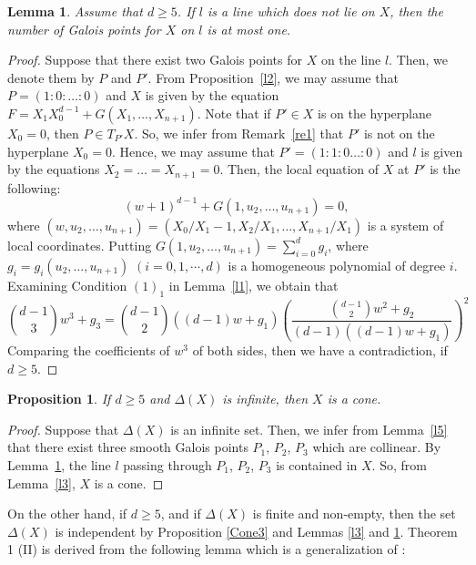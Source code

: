\documentclass[10pt,oneside]{amsart}
\newtheorem{proposition}{Proposition}
\newtheorem{lemma}{Lemma}
\theoremstyle{definition}
\begin{document}
\begin{lemma}\label{l4} Assume that $d \geq 5$. 
If $l$ is a line which does not lie on $X$, then the number of Galois points for $X$ on $l$ is at most one. 
\end{lemma}
\begin{proof} 
Suppose that there exist two Galois points for $X$ on the line $l$. 
Then, we denote them by $P$ and $P'$. 
From Proposition~\ref{l2}, we may assume that $P=(1:0:\dots:0)$ and $X$ is given by the equation $F=X_1X_{0}^{d-1}+G(X_1, \dots, X_{n+1})$. 
Note that if $P' \in X$ is on the hyperplane $X_{0}=0$, then $P \in T_{P'}X$. 
So, we infer from Remark~\ref{re1} that $P'$ is not on the hyperplane $X_{0}=0$. 
Hence, we may assume that $P'=(1:1:0\dots:0)$ and $l$ is given by the equations $X_2=\dots=X_{n+1}=0$. 
Then, the local equation of $X$ at $P'$ is the following: 
$$(w+1)^{d-1}+G(1, u_2, \dots, u_{n+1})=0,$$
where $(w, u_2, \dots, u_{n+1})=(X_{0}/X_1-1,X_2/X_1, \dots, X_{n+1}/X_1)$ is a system of local coordinates. 
Putting $G(1, u_2, \dots, u_{n+1}) = \sum_{i=0}^d g_i$, where $g_i = g_i(u_2, \dots, u_{n+1})$ $(i=0,1,\cdots, d)$ is a homogeneous polynomial of degree $i$. 
Examining Condition $(1)_1$ in Lemma~\ref{l1}, we obtain that 
$$\binom{d-1}{3}{w}^3 +g_3= \binom{d-1}{2} \left( (d-1)w+g_1 \right) \left(\frac{\binom{d-1}{2}{w}^2+g_2}{(d-1)\left( (d-1)w+g_1 \right) }\right)^2$$
Comparing the coefficients of $w^3$ of both sides, then we have a contradiction, if $d \ge 5$. 
\end{proof} 

\begin{proposition} \label{Infinite1} 
If $d \ge 5$ and $\Delta(X)$ is infinite, then $X$ is a cone. 
\end{proposition}

\begin{proof}
Suppose that $\Delta(X)$ is an infinite set. 
Then, we infer from Lemma~\ref{l5} that there exist three smooth Galois points $P_1$, $P_2$, $P_3$ which are collinear. 
By Lemma~\ref{l4}, the line $l$ passing through $P_1$, $P_2$, $P_3$ is contained in $X$. So, from Lemma~\ref{l3}, $X$ is a cone. 
\end{proof} 

On the other hand, if $d \ge 5$, and if $\Delta(X)$ is finite and non-empty, then the set $\Delta(X)$ is independent by Proposition \ref{Cone3} and Lemmas \ref{l3} and \ref{l4}. 
Theorem 1 (II) is derived from the following lemma which is a generalization of \cite[Lemma~4]{yoshihara3}: 
 
\end{document}
